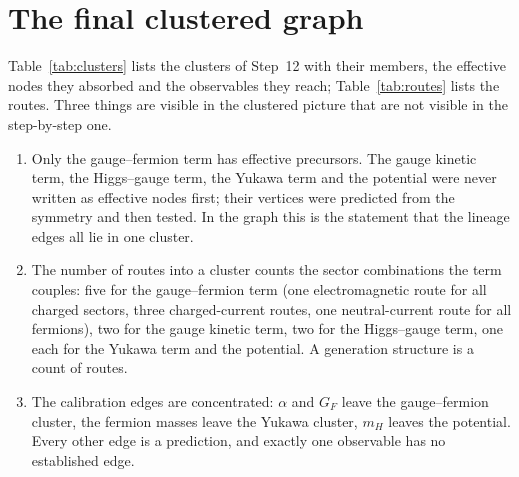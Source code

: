 \documentclass[11pt,a4paper]{article}
\begin{document}
\section{The final clustered graph}\label{sec:final}
Table~\ref{tab:clusters} lists the clusters of Step~12 with their members, the effective nodes they absorbed and the observables they reach; Table~\ref{tab:routes} lists the routes. Three things are visible in the clustered picture that are not visible in the step-by-step one.
\begin{enumerate}
\item Only the gauge--fermion term has effective precursors. The gauge kinetic term, the Higgs--gauge term, the Yukawa term and the potential were never written as effective nodes first; their vertices were predicted from the symmetry and then tested. In the graph this is the statement that the lineage edges all lie in one cluster.
\item The number of routes into a cluster counts the sector combinations the term couples: five for the gauge--fermion term (one electromagnetic route for all charged sectors, three charged-current routes, one neutral-current route for all fermions), two for the gauge kinetic term, two for the Higgs--gauge term, one each for the Yukawa term and the potential. A generation structure is a count of routes.
\item The calibration edges are concentrated: $\alpha$ and $G_F$ leave the gauge--fermion cluster, the fermion masses leave the Yukawa cluster, $m_H$ leaves the potential. Every other edge is a prediction, and exactly one observable has no established edge.
\end{enumerate}





\end{document}
